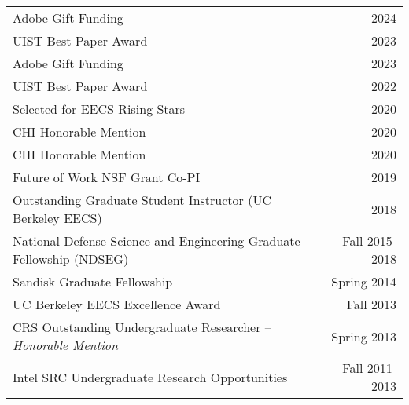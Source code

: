 \begin{longtable}{Xr}
	Adobe Gift Funding & 2024 \\
	UIST Best Paper Award & 2023 \\
	Adobe Gift Funding & 2023 \\
	UIST Best Paper Award & 2022 \\
	Selected for EECS Rising Stars & 2020 \\
	CHI Honorable Mention & 2020 \\
	CHI Honorable Mention & 2020 \\
	Future of Work NSF Grant Co-PI & 2019 \\
	Outstanding Graduate Student Instructor (UC Berkeley EECS) & 2018 \\
	National Defense Science and Engineering Graduate Fellowship (NDSEG) & Fall 2015-2018 \\
	Sandisk Graduate Fellowship & Spring 2014 \\
	UC Berkeley EECS Excellence Award & Fall 2013 \\
	CRS Outstanding Undergraduate Researcher -- \textit{Honorable Mention} & Spring 2013 \\
	Intel SRC Undergraduate Research Opportunities & Fall 2011-2013 \\
\end{longtable}